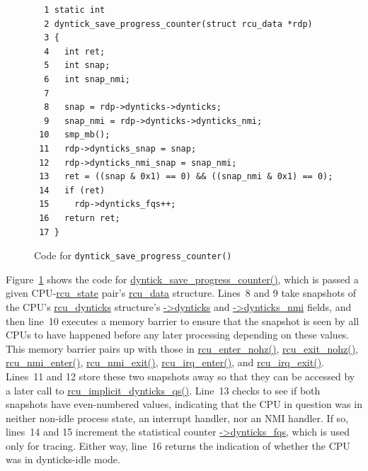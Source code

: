 \begin{figure}[tbp]
{ \scriptsize
\begin{verbatim}
  1 static int
  2 dyntick_save_progress_counter(struct rcu_data *rdp)
  3 {
  4   int ret;
  5   int snap;
  6   int snap_nmi;
  7 
  8   snap = rdp->dynticks->dynticks;
  9   snap_nmi = rdp->dynticks->dynticks_nmi;
 10   smp_mb();
 11   rdp->dynticks_snap = snap;
 12   rdp->dynticks_nmi_snap = snap_nmi;
 13   ret = ((snap & 0x1) == 0) && ((snap_nmi & 0x1) == 0);
 14   if (ret)
 15     rdp->dynticks_fqs++;
 16   return ret;
 17 }
\end{verbatim}
}
\caption{Code for {\tt dyntick\_save\_progress\_counter()}}
\label{fig:app:rcuimpl:rcutreewt:Code for dyntick-save-progress-counter}
\end{figure}

Figure~\ref{fig:app:rcuimpl:rcutreewt:Code for dyntick-save-progress-counter}
shows the code for \url{dyntick_save_progress_counter()}, which
is passed a given CPU-\url{rcu_state} pair's \url{rcu_data} structure.
Lines~8 and 9 take snapshots of the CPU's \url{rcu_dynticks} structure's
\url{->dynticks} and \url{->dynticks_nmi} fields,
and then line~10 executes a memory barrier to ensure that the snapshot
is seen by all CPUs to have happened before any later processing
depending on these values.
This memory barrier pairs up with those in \url{rcu_enter_nohz()},
\url{rcu_exit_nohz()}, \url{rcu_nmi_enter()}, \url{rcu_nmi_exit()},
\url{rcu_irq_enter()}, and \url{rcu_irq_exit()}.
Lines~11 and 12 store these two snapshots away so that they can be
accessed by a later call to \url{rcu_implicit_dynticks_qs()}.
Line~13 checks to see if both snapshots have even-numbered values,
indicating that the CPU in question was in neither non-idle process
state, an interrupt handler, nor an NMI handler.
If so, lines~14 and 15 increment the statistical counter
\url{->dynticks_fqs}, which is used only for tracing.
Either way, line~16 returns the indication of whether the CPU was
in dynticks-idle mode.

